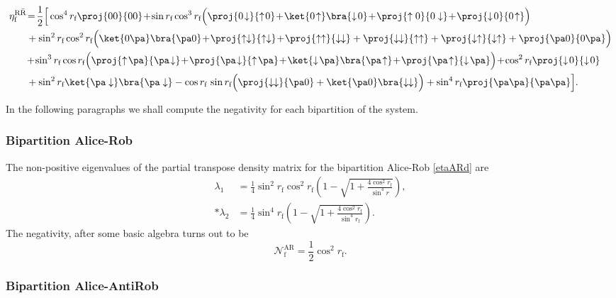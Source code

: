 \begin{align}\label{etaRaRd}
\nonumber \eta^{\text{R}{\bar{\text{R}}}}_\text{f}&\!=\!\frac{1}{2}\Big[\cos^4 r_\text{f} \proj{00}{00}\!+\!\sin r_\text{f} \cos^3 r_\text{f}\Big(\proj{0\!\downarrow}{\uparrow\! 0}\!+\!\ket{0\!\uparrow} \bra{\downarrow\! 0}\!+\!\proj{\uparrow 0}{0 \downarrow}\!+\!\proj{\downarrow\! 0}{0\!\uparrow}\Big)\\*
&\nonumber+\sin^2 r_\text{f} \cos^2 r_\text{f}\Big(\ket{0\pa}\bra{\pa0}\!+\!\proj{\uparrow\downarrow}{\uparrow\downarrow}\!+\!\proj{\uparrow\uparrow}{\downarrow\downarrow} +\proj{\downarrow\downarrow}{\uparrow\uparrow}+\proj{\downarrow\uparrow}{\downarrow\uparrow}+\proj{\pa0}{0\pa}\Big)\\*
&\nonumber\!+\! \sin^3 r_\text{f}\cos r_\text{f}\Big(\proj{\uparrow\!\pa}{\pa\!\downarrow}\!+\!\proj{\pa\!\downarrow}{\uparrow\!\pa}\!+\!\ket{\downarrow\!\pa}\bra{\pa\!\uparrow}\!+\!\proj{\pa\!\uparrow}{\downarrow\!\pa}\Big)\!+\!\cos^2 r_\text{f}\proj{\downarrow\! 0}{\downarrow\! 0}\\*
&+\sin^2 r_\text{f} \ket{\pa\downarrow} \bra{\pa\downarrow}-\cos r_\text{f}\,\sin r_\text{f}\Big(\proj{\downarrow\downarrow}{\pa0}+\ket{\pa0}\bra{\downarrow\downarrow}\Big)+\sin^4r_\text{f}\proj{\pa\pa}{\pa\pa}\Big].
\end{align}

In the following paragraphs we shall compute the negativity for each bipartition of the system.
 
\subsubsection{Bipartition Alice-Rob}

The non-positive eigenvalues of the partial transpose density matrix  for the bipartition Alice-Rob \eqref{etaARd} are
\begin{align}\label{eigetaARf}
\nonumber \lambda_{1}&=\frac14\sin^2 r_\text{f}\cos^2 r_\text{f}\left(1-\sqrt{1+\frac{4\cos^2 r_\text{f}}{\sin^4 r}}\right),\\*
 \lambda_{2}&=\frac14\sin^4 r_\text{f}\left(1-\sqrt{1+\frac{4\cos^2 r_\text{f}}{\sin^4 r_\text{f}}}\right).
\end{align}
The negativity, after some basic algebra turns out to be
\begin{equation}
\mathcal{N}_\text{f}^\text{AR}=\frac12\cos^2r_\text{f}.
\end{equation}

\subsubsection{Bipartition Alice-AntiRob}

